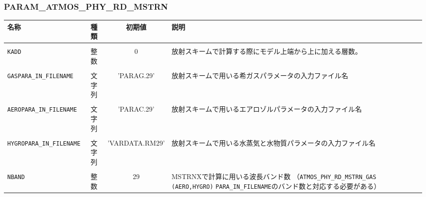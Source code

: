 \subsubsection{PARAM\_ATMOS\_PHY\_RD\_MSTRN}
\begin{tabularx}{150mm}{|l|c|c|X|} \hline
 \rowcolor[gray]{0.9} 名称 & 種類 & 初期値 & 説明 \\ \hline
 \shortstack{\verb|ATMOS_PHY_RD_MSTRN_|\\ \verb|KADD|} & 整数 & 0 & 放射スキームで計算する際にモデル上端から上に加える層数。 \\ \hline
 \shortstack{\verb|ATMOS_PHY_RD_MSTRN_|\\ \verb|GASPARA_IN_FILENAME|} & 文字列 & 'PARAG.29' & 放射スキームで用いる希ガスパラメータの入力ファイル名 \\ \hline
 \shortstack{\verb|ATMOS_PHY_RD_MSTRN_|\\ \verb|AEROPARA_IN_FILENAME|} & 文字列 & 'PARAC.29' & 放射スキームで用いるエアロゾルパラメータの入力ファイル名 \\ \hline
 \shortstack{\verb|ATMOS_PHY_RD_MSTRN_|\\ \verb|HYGROPARA_IN_FILENAME|} & 文字列 & 'VARDATA.RM29' & 放射スキームで用いる水蒸気と水物質パラメータの入力ファイル名 \\ \hline
 \shortstack{\verb|ATMOS_PHY_RD_MSTRN_|\\ \verb|NBAND|} & 整数 & 29 & MSTRNXで計算に用いる波長バンド数
（\verb|ATMOS_PHY_RD_MSTRN_GAS| \verb|(AERO,HYGRO)| \verb|PARA_IN_FILENAME|のバンド数と対応する必要がある） \\ \hline
\end{tabularx}

